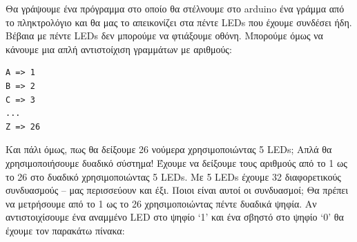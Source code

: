 \documentclass[a4paper,twoside,12pt]{article}
\begin{document}
Θα γράψουμε ένα πρόγραμμα στο οποίο θα στέλνουμε στο arduino ένα γράμμα από το πληκτρολόγιο και θα μας το απεικονίζει στα πέντε LEDs που έχουμε συνδέσει ήδη. Βέβαια με πέντε LEDs δεν μπορούμε να φτιάξουμε οθόνη. Μπορούμε όμως να κάνουμε μια απλή αντιστοίχιση γραμμάτων με αριθμούς:

\begin{verbatim}
Α => 1
Β => 2
C => 3
...
Z => 26
\end{verbatim}

Και πάλι όμως, πως θα δείξουμε 26 νούμερα χρησιμοποιώντας 5 LEDs; Απλά θα χρησιμοποιήσουμε δυαδικό σύστημα! Έχουμε να δείξουμε τους αριθμούς από το 1 ως το 26 στο δυαδικό χρησιμοποιώντας 5 LEDs. Με 5 LEDs έχουμε 32 διαφορετικούς συνδυασμούς -- μας περισσεύουν και έξι. Ποιοι είναι αυτοί οι συνδυασμοί;  Θα πρέπει να μετρήσουμε από το 1 ως το 26 χρησιμοποιώντας πέντε δυαδικά ψηφία. Αν αντιστοιχίσουμε ένα αναμμένο LED στο ψηφίο `1' και ένα σβηστό στο ψηφίο `0' θα έχουμε τον παρακάτω πίνακα:
\end{document}
